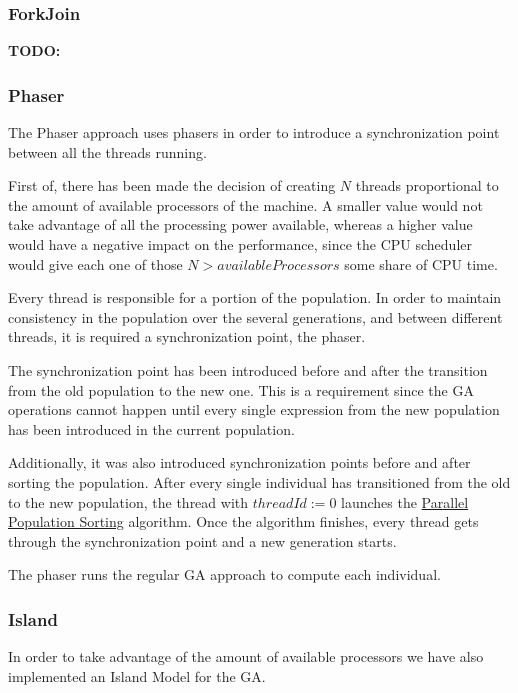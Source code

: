 \documentclass[runningheads]{llncs}
\begin{document}
\subsubsection{ForkJoin} \hfill \par
\textbf{TODO:}

\subsubsection{Phaser} \hfill \par
The Phaser approach uses phasers in order to introduce a synchronization point between all the threads running.

First of, there has been made the decision of creating \(N\) threads proportional to the amount of available processors of the machine. A smaller value would not take advantage of all the processing power available, whereas a higher value would have a negative impact on the performance, since the CPU scheduler would give each one of those \(N > availableProcessors\) some share of CPU time.

Every thread is responsible for a portion of the population. In order to maintain consistency in the population over the several generations, and between different threads, it is required a synchronization point, the phaser. 

The synchronization point has been introduced before and after the transition from the old population to the new one. This is a requirement since the GA operations cannot happen until every single expression from the new population has been introduced in the current population.

Additionally, it was also introduced synchronization points before and after sorting the population. After every single individual has transitioned from the old to the new population, the thread with \(threadId := 0\) launches the \hyperref[subsubsec:parallelSort]{Parallel Population Sorting} algorithm. Once the algorithm finishes, every thread gets through the synchronization point and a new generation starts.

The phaser runs the regular GA approach to compute each individual.

\subsubsection{Island} \hfill \par
In order to take advantage of the amount of available processors we have also implemented an Island Model for the GA\cite{islandModelGA}.
\end{document}
